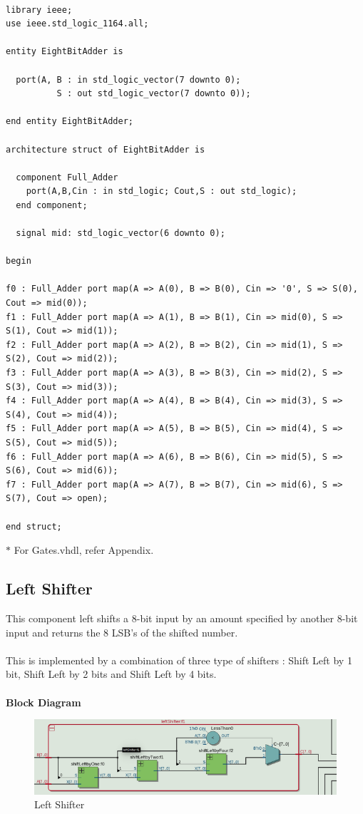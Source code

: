 \documentclass[12pt]{article}
\begin{document}
\begin{verbatim}

library ieee;
use ieee.std_logic_1164.all;

entity EightBitAdder is

  port(A, B : in std_logic_vector(7 downto 0);
	      S : out std_logic_vector(7 downto 0));
		  
end entity EightBitAdder;

architecture struct of EightBitAdder is
  
  component Full_Adder
	port(A,B,Cin : in std_logic; Cout,S : out std_logic);
  end component;
	
  signal mid: std_logic_vector(6 downto 0);
	
begin

f0 : Full_Adder port map(A => A(0), B => B(0), Cin => '0', S => S(0), Cout => mid(0));
f1 : Full_Adder port map(A => A(1), B => B(1), Cin => mid(0), S => S(1), Cout => mid(1));
f2 : Full_Adder port map(A => A(2), B => B(2), Cin => mid(1), S => S(2), Cout => mid(2));
f3 : Full_Adder port map(A => A(3), B => B(3), Cin => mid(2), S => S(3), Cout => mid(3));
f4 : Full_Adder port map(A => A(4), B => B(4), Cin => mid(3), S => S(4), Cout => mid(4));
f5 : Full_Adder port map(A => A(5), B => B(5), Cin => mid(4), S => S(5), Cout => mid(5));
f6 : Full_Adder port map(A => A(6), B => B(6), Cin => mid(5), S => S(6), Cout => mid(6));
f7 : Full_Adder port map(A => A(7), B => B(7), Cin => mid(6), S => S(7), Cout => open);

end struct;
\end{verbatim}
        \noindent
        $\ast$ For Gates.vhdl, refer Appendix.
    \subsection{Left Shifter}
        This component left shifts a 8-bit input by an amount specified by another 8-bit input and returns the 8 LSB's of the shifted number.\\\\
        This is implemented by a combination of three type of shifters : Shift Left by 1 bit, Shift Left by 2 bits and Shift Left by 4 bits.\\\\
        \noindent
        \textbf{Block Diagram}
        \begin{figure}[H]
            \centering
            \includegraphics[width=0.6\linewidth]{leftshifter.png}
            \caption{Left Shifter}
            \label{fig:instru}
        \end{figure}
        
\end{document}
